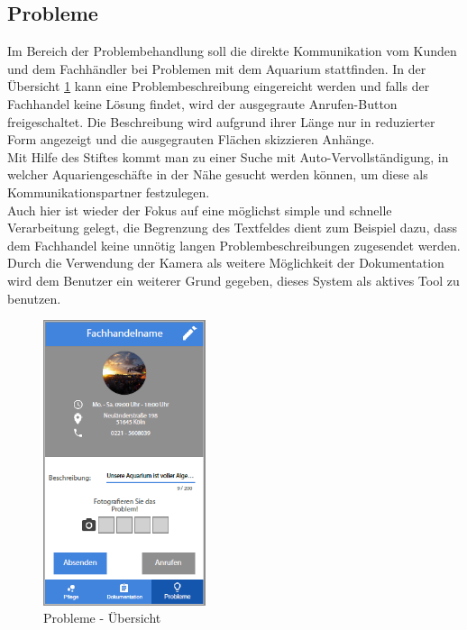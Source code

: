 \subsection{Probleme}
Im Bereich der Problembehandlung soll die direkte Kommunikation vom Kunden und dem Fachhändler bei Problemen mit dem Aquarium stattfinden. In der Übersicht \ref{probs} kann eine Problembeschreibung eingereicht werden und falls der Fachhandel keine Lösung findet, wird der ausgegraute Anrufen-Button freigeschaltet. Die Beschreibung wird aufgrund ihrer Länge nur in reduzierter Form angezeigt und die ausgegrauten Flächen skizzieren Anhänge. \\
Mit Hilfe des Stiftes kommt man zu einer Suche mit Auto-Vervollständigung, in welcher Aquariengeschäfte in der Nähe gesucht werden können, um diese als Kommunikationspartner festzulegen. \\
Auch hier ist wieder der Fokus auf eine möglichst simple und schnelle Verarbeitung gelegt, die Begrenzung des Textfeldes dient zum Beispiel dazu, dass dem Fachhandel keine unnötig langen Problembeschreibungen zugesendet werden. Durch die Verwendung der Kamera als weitere Möglichkeit der Dokumentation wird dem Benutzer ein weiterer Grund gegeben, dieses System als aktives Tool zu benutzen. 
		
\begin{figure}
	\centering
	\includegraphics[width=180px,height=\textheight,
keepaspectratio]{Probleme}
	\caption{Probleme - Übersicht}
	\label{probs}
\end{figure}

